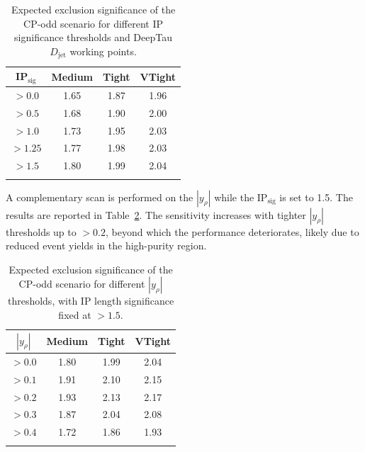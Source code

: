 \begin{table}[!htbp]
\centering
\renewcommand{\arraystretch}{1.5} %
\setlength{\tabcolsep}{10pt} %
\begin{tabular}{c c c c}
\hline
IP$_\text{sig}$ & Medium & Tight & VTight \\
\hline
$>0.0$           & 1.65 & 1.87 & 1.96 \\
\arrayrulecolor{lightgray} \hline
$>0.5$           & 1.68 & 1.90 & 2.00 \\
\arrayrulecolor{lightgray} \hline
$>1.0$           & 1.73 & 1.95 & 2.03 \\
\arrayrulecolor{lightgray} \hline
$>1.25$          & 1.77 & 1.98 & 2.03 \\
\arrayrulecolor{lightgray} \hline
$>1.5$ & 1.80 & 1.99 & 2.04 \\
\arrayrulecolor{black} \hline
\end{tabular}
\caption{Expected exclusion significance of the CP-odd scenario for different IP significance thresholds and DeepTau $D_{\text{jet}}$ working points.}
\label{Table:Chapter7_IPsignificance_Optimisation}
\end{table}

A complementary scan is performed on the $|y_\rho|$ while the IP$_\text{sig}$ is set to 1.5. The results are reported in Table~\ref{Table:Chapter7_yrho_Optimisation}. The sensitivity increases with tighter $|y_\rho|$ thresholds up to $>0.2$, beyond which the performance deteriorates, likely due to reduced event yields in the high-purity region.  

\begin{table}[!htbp]
\centering
\renewcommand{\arraystretch}{1.5} %
\setlength{\tabcolsep}{10pt} %
\begin{tabular}{c c c c}
\hline
$|y_\rho|$ & Medium & Tight & VTight \\
\hline
$>0.0$ & 1.80 & 1.99 & 2.04 \\
\arrayrulecolor{lightgray} \hline
$>0.1$           & 1.91 & 2.10 & 2.15 \\
\arrayrulecolor{lightgray} \hline

$>0.2$           & 1.93 & 2.13 & 2.17 \\
\arrayrulecolor{lightgray} \hline

$>0.3$           & 1.87 & 2.04 & 2.08 \\
\arrayrulecolor{lightgray} \hline

$>0.4$           & 1.72 & 1.86 & 1.93 \\
\arrayrulecolor{black} \hline
\end{tabular}
\caption{Expected exclusion significance of the CP-odd scenario for different $|y_\rho|$ thresholds, with IP length significance fixed at $>1.5$.}
\label{Table:Chapter7_yrho_Optimisation}
\end{table}

